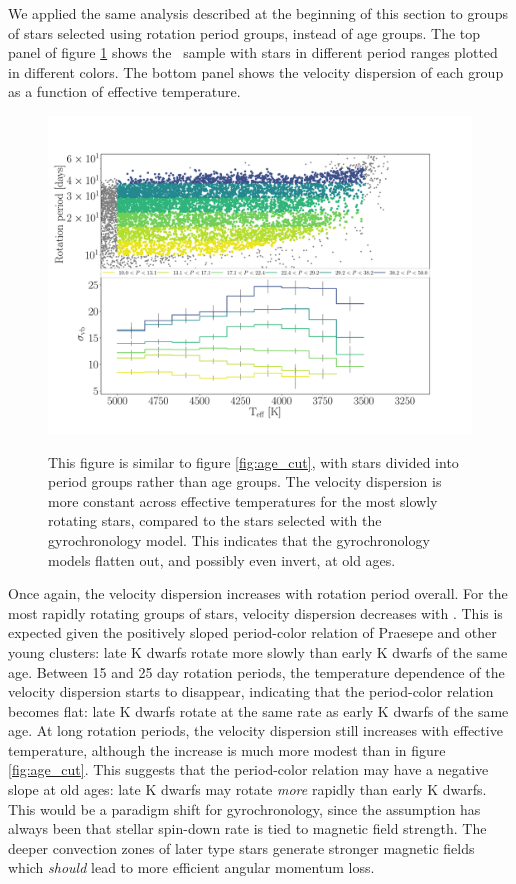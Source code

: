 We applied the same analysis described at the beginning of this section to
groups of stars selected using rotation period groups, instead of age groups.
The top panel of figure \ref{fig:period_cut} shows the \mct\ sample with
stars in different period ranges plotted in different colors.
The bottom panel shows the velocity dispersion of each group as a function of
effective temperature.
\begin{figure}
  \caption{
This figure is similar to figure \ref{fig:age_cut}, with stars divided into
    period groups rather than age groups.
The velocity dispersion is more constant across effective temperatures for the
    most slowly rotating stars, compared to the stars selected with the
    \citet{angus2018} gyrochronology model.
    This indicates that the gyrochronology models flatten out, and possibly
    even invert, at old ages.
}
  \centering
    \includegraphics[width=1\textwidth]{period_cut}
\label{fig:period_cut}
\end{figure}
Once again, the velocity dispersion increases with rotation period overall.
For the most rapidly rotating groups of stars, velocity dispersion decreases
with \teff.
This is expected given the positively sloped period-color relation of Praesepe
and other young clusters: late K dwarfs rotate more slowly than early K dwarfs
of the same age.
Between 15 and 25 day rotation periods, the temperature dependence of the
velocity dispersion starts to disappear, indicating that the period-color
relation becomes flat: late K dwarfs rotate at the same rate as early K dwarfs
of the same age.
At long rotation periods, the velocity dispersion still increases with
effective temperature, although the increase is much more modest than in
figure \ref{fig:age_cut}.
This suggests that the period-color relation may have a negative slope at old
ages: late K dwarfs may rotate {\it more} rapidly than early K dwarfs.
This would be a paradigm shift for gyrochronology, since the assumption has
always been that stellar spin-down rate is tied to magnetic field strength.
The deeper convection zones of later type stars generate stronger magnetic
fields which {\it should} lead to more efficient angular momentum loss.

